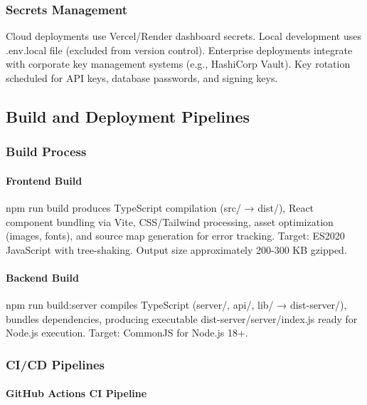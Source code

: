 \documentclass[12pt,oneside,openright,a4paper]{cpe-english-project}
\begin{document}
\subsubsection{Secrets Management}

Cloud deployments use Vercel/Render dashboard secrets. Local development uses .env.local file (excluded from version control). Enterprise deployments integrate with corporate key management systems (e.g., HashiCorp Vault). Key rotation scheduled for API keys, database passwords, and signing keys.

\vspace{1em}

\subsection{Build and Deployment Pipelines}

\subsubsection{Build Process}

\paragraph{Frontend Build}

npm run build produces TypeScript compilation (src/ → dist/), React component bundling via Vite, CSS/Tailwind processing, asset optimization (images, fonts), and source map generation for error tracking. Target: ES2020 JavaScript with tree-shaking. Output size approximately 200-300 KB gzipped.

\paragraph{Backend Build}

npm run build:server compiles TypeScript (server/, api/, lib/ → dist-server/), bundles dependencies, producing executable dist-server/server/index.js ready for Node.js execution. Target: CommonJS for Node.js 18+.

\subsubsection{CI/CD Pipelines}

\paragraph{GitHub Actions CI Pipeline}
\end{document}
